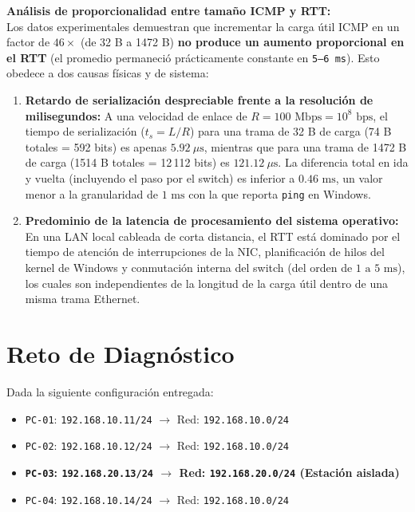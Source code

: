 \documentclass[11pt, a4paper]{article}
\begin{document}
\noindent \textbf{Análisis de proporcionalidad entre tamaño ICMP y RTT:} \\
Los datos experimentales demuestran que incrementar la carga útil ICMP en un factor de $46\times$ (de 32 B a 1472 B) \textbf{no produce un aumento proporcional en el RTT} (el promedio permaneció prácticamente constante en \texttt{5--6 ms}). Esto obedece a dos causas físicas y de sistema:
\begin{enumerate}
    \item \textbf{Retardo de serialización despreciable frente a la resolución de milisegundos:} A una velocidad de enlace de $R = 100\text{ Mbps} = 10^8\text{ bps}$, el tiempo de serialización ($t_s = L / R$) para una trama de 32 B de carga (74 B totales = 592 bits) es apenas $5.92\ \mu\text{s}$, mientras que para una trama de 1472 B de carga (1514 B totales = 12\,112 bits) es $121.12\ \mu\text{s}$. La diferencia total en ida y vuelta (incluyendo el paso por el switch) es inferior a $0.46\text{ ms}$, un valor menor a la granularidad de $1\text{ ms}$ con la que reporta \texttt{ping} en Windows.
    \item \textbf{Predominio de la latencia de procesamiento del sistema operativo:} En una LAN local cableada de corta distancia, el RTT está dominado por el tiempo de atención de interrupciones de la NIC, planificación de hilos del kernel de Windows y conmutación interna del switch (del orden de $1\text{ a }5\text{ ms}$), los cuales son independientes de la longitud de la carga útil dentro de una misma trama Ethernet.
\end{enumerate}

\section{Reto de Diagnóstico}

Dada la siguiente configuración entregada:
\begin{itemize}
    \item \texttt{PC-01}: \texttt{192.168.10.11/24} $\rightarrow$ Red: \texttt{192.168.10.0/24}
    \item \texttt{PC-02}: \texttt{192.168.10.12/24} $\rightarrow$ Red: \texttt{192.168.10.0/24}
    \item \textbf{\texttt{PC-03}: \texttt{192.168.20.13/24} $\rightarrow$ Red: \texttt{192.168.20.0/24} (Estación aislada)}
    \item \texttt{PC-04}: \texttt{192.168.10.14/24} $\rightarrow$ Red: \texttt{192.168.10.0/24}
\end{itemize}
\end{document}
